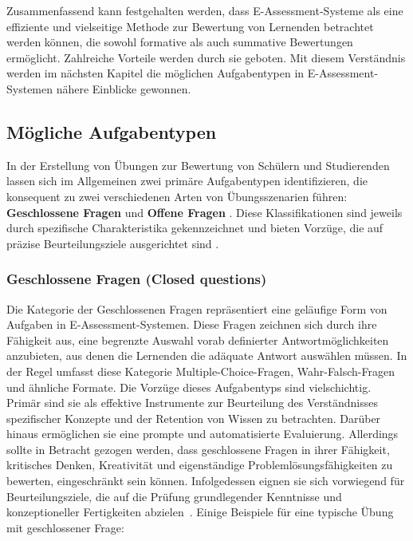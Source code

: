 Zusammenfassend kann festgehalten werden, dass E-Assessment-Systeme als eine effiziente und vielseitige Methode zur Bewertung von Lernenden betrachtet werden können, die sowohl formative als auch summative Bewertungen ermöglicht. Zahlreiche Vorteile werden durch sie geboten. Mit diesem Verständnis werden im nächsten Kapitel die möglichen Aufgabentypen in E-Assessment-Systemen nähere Einblicke gewonnen.

\subsection{Mögliche Aufgabentypen}

In der Erstellung von Übungen zur Bewertung von Schülern und Studierenden lassen sich im Allgemeinen zwei primäre Aufgabentypen identifizieren, die konsequent zu zwei verschiedenen Arten von Übungsszenarien führen: \textbf{Geschlossene Fragen} und \textbf{Offene Fragen} \cite{review-e}. Diese Klassifikationen sind jeweils durch spezifische Charakteristika gekennzeichnet und bieten Vorzüge, die auf präzise Beurteilungsziele ausgerichtet sind \cite{kocdar2018cheating}.

\subsubsection{\gls{Geschlossene Fragen} (Closed questions)}

Die Kategorie der Geschlossenen Fragen repräsentiert eine geläufige Form von Aufgaben in E-Assessment-Systemen.
Diese Fragen zeichnen sich durch ihre Fähigkeit aus, eine begrenzte Auswahl vorab definierter Antwortmöglichkeiten
anzubieten, aus denen die Lernenden die adäquate Antwort auswählen müssen\cite{gruttmann2009formatives}. In der Regel
umfasst diese Kategorie Multiple-Choice-Fragen, Wahr-Falsch-Fragen und ähnliche Formate. Die Vorzüge dieses Aufgabentyps
sind vielschichtig. Primär sind sie als effektive Instrumente zur Beurteilung des Verständnisses spezifischer Konzepte
und der Retention von Wissen zu betrachten. Darüber hinaus ermöglichen sie eine prompte und automatisierte Evaluierung.
Allerdings sollte in Betracht gezogen werden, dass geschlossene Fragen in ihrer Fähigkeit, kritisches Denken,
Kreativität und eigenständige Problemlösungsfähigkeiten zu bewerten, eingeschränkt sein können. Infolgedessen eignen
sie sich vorwiegend für Beurteilungsziele, die auf die Prüfung grundlegender Kenntnisse und konzeptioneller Fertigkeiten
abzielen~\cite{gruttmann2009formatives}. Einige Beispiele für eine typische Übung mit geschlossener Frage:

